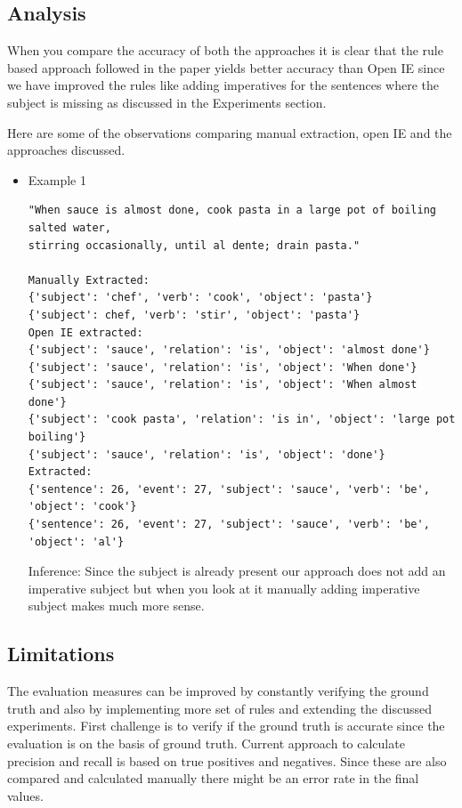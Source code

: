 \documentclass[11pt,letterpaper]{article}
\begin{document}
\subsection{Analysis}

When you compare the accuracy of both the approaches it is clear that the rule based approach followed in the paper yields better accuracy than Open IE since we have improved the rules like adding imperatives for the sentences where the subject is missing as discussed in the Experiments section.\newline

Here are some of the observations comparing manual extraction, open IE and the approaches discussed.
\begin{itemize}
\item Example 1
\begin{verbatim}
"When sauce is almost done, cook pasta in a large pot of boiling salted water, 
stirring occasionally, until al dente; drain pasta."

Manually Extracted: 
{'subject': 'chef', 'verb': 'cook', 'object': 'pasta'}
{'subject': chef, 'verb': 'stir', 'object': 'pasta'}
Open IE extracted: 
{'subject': 'sauce', 'relation': 'is', 'object': 'almost done'}
{'subject': 'sauce', 'relation': 'is', 'object': 'When done'}
{'subject': 'sauce', 'relation': 'is', 'object': 'When almost done'}
{'subject': 'cook pasta', 'relation': 'is in', 'object': 'large pot boiling'}
{'subject': 'sauce', 'relation': 'is', 'object': 'done'}
Extracted: 
{'sentence': 26, 'event': 27, 'subject': 'sauce', 'verb': 'be', 'object': 'cook'}
{'sentence': 26, 'event': 27, 'subject': 'sauce', 'verb': 'be', 'object': 'al'}
\end{verbatim}

Inference: Since the subject is already present our approach does not add an imperative subject but when you look at it manually adding imperative subject makes much more sense.

\end{itemize}

\subsection{Limitations}

The evaluation measures can be improved by constantly verifying the ground truth and also by implementing more set of rules and extending the discussed experiments. First challenge is to verify if the ground truth is accurate since the evaluation is on the basis of ground truth. Current approach to calculate precision and recall is based on true positives and negatives. Since these are also compared and calculated manually there might be an error rate in the final values.
\newline
\end{document}
